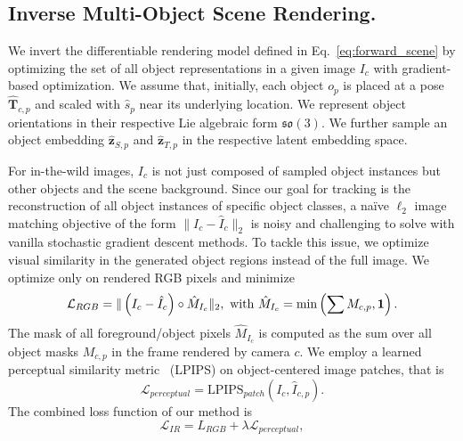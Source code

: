 \subsection{Inverse Multi-Object Scene Rendering.}\label{ssec:scene_rep}
%
We invert the differentiable rendering model defined in Eq.~\ref{eq:forward_scene} by optimizing the set of all object representations in a given image $I_c$ with gradient-based optimization. We assume that, initially, each object $o_p$ is placed at a pose $\hat{\mathbf{T}}_{c,p}$ and scaled with $\hat s_p$ near its underlying location. We represent object orientations in their respective Lie algebraic form $\mathfrak{so}(3)$. We further sample an object embedding $\hat{\mathbf{z}}_{S,p}$ and $\hat{\mathbf{z}}_{T,p}$ in the respective latent embedding space.


For in-the-wild images, $I_c$ is not just composed of sampled object instances but other objects and the scene background. Since our goal for tracking is the reconstruction of all object instances of specific object classes, a na\"ive $\ell_2$ image matching objective of the form $\| I_c - \hat{I}_c \|_2$ is noisy and challenging to solve with vanilla stochastic gradient descent methods. To tackle this issue, we optimize visual similarity in the generated object regions instead of the full image. We optimize only on rendered RGB pixels and minimize
\begin{equation}\label{eq:loss_mse}
    \mathcal{L}_{RGB} = \| \left( I_c - \hat{I}_c \right) \circ \hat{M}_{I_c} \|_2, \text{\,\,with\ }\nonumber \hat{M}_{I_c} = \min \left( \sum M_{c,p} , \mathbf{1}\right).
\end{equation}
The mask of all foreground/object pixels $\hat{M}_{I_c}$ is computed as the sum over all object masks $M_{c,p}$ in the frame rendered by camera $c$.
We employ a learned perceptual similarity metric~\cite{zhang2018perceptual} (LPIPS) on object-centered image patches, that is
\begin{equation}\label{eq:loss_lpips}
    \mathcal{L}_{perceptual} = \text{LPIPS}_{patch}\left( I_c, \hat{I}_{c,p}  \right).
\end{equation}
The combined loss function of our method is
\begin{equation}\label{eq:loss_mse_lpips}
    \mathcal{L}_{IR} = {L}_{RGB} + \lambda \mathcal{L}_{perceptual},
\end{equation}
